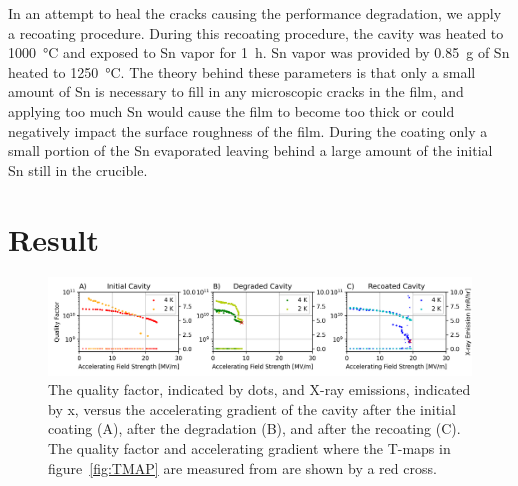 \documentclass{revtex4-2}
\begin{document}
In an attempt to heal the cracks causing the performance degradation, we apply a recoating procedure. During this recoating procedure, the cavity was heated to \qty{1000}{\degreeCelsius} and exposed to Sn vapor for \qty{1}{\hour}. Sn vapor was provided by \qty{0.85}{\gram} of Sn heated to \qty{1250}{\degreeCelsius}. The theory behind these parameters is that only a small amount of Sn is necessary to fill in any microscopic cracks in the film, and applying too much Sn would cause the film to become too thick or could negatively impact the surface roughness of the film. During the coating only a small portion of the Sn evaporated leaving behind a large amount of the initial Sn still in the crucible. 

\section{Result}
\label{sec:Results}

\begin{figure}[h]%
    \centering%
    \includegraphics[width=1.0\columnwidth]{./figures/VTS.png}%
    \caption{The quality factor, indicated by dots, and X-ray emissions, indicated by x, versus the accelerating gradient of the cavity after the initial coating (A), after the degradation (B), and after the recoating (C). The quality factor and accelerating gradient where the T-maps in figure~\ref{fig:TMAP} are measured from are shown by a red cross.}%
    \label{fig:VTS}%
\end{figure}
\end{document}
